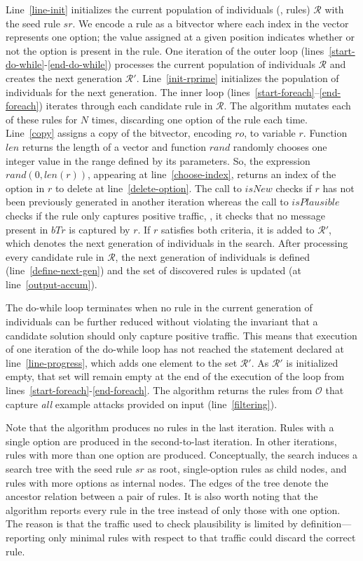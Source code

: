 \documentclass[sigconf,review, anonymous]{acmart}
\begin{document}
Line~\ref{line-init} initializes the current population of individuals
(\ie{}, rules) $\mathcal{R}$ with the seed rule $sr$. We encode a rule
as a bitvector where each index in the vector represents one option;
the value assigned at a given position indicates whether or not the
option is present in the rule. One iteration of the outer loop
(lines~\ref{start-do-while}-\ref{end-do-while}) processes the current
population of individuals $\mathcal R$ and creates the next generation
$\mathcal R'$. Line~\ref{init-rprime} initializes the population of
individuals for the next generation. The inner loop
(lines~\ref{start-foreach}--\ref{end-foreach}) iterates through each
candidate rule in $\mathcal R$. The algorithm mutates each of these
rules for $N$ times, discarding one option of the rule each
time. Line~\ref{copy} assigns a copy of the bitvector, encoding
$\mathit{ro}$, to variable $r$. Function $\mathit{len}$ returns the
length of a vector and function $\mathit{rand}$ randomly chooses one
integer value in the range defined by its parameters. So, the
expression $\mathit{rand(0, len(r))}$, appearing at
line~\ref{choose-index}, returns an index of the option in $r$ to
delete at line~\ref{delete-option}. The call to $\mathit{isNew}$
checks if $r$ has not been previously generated in another iteration
whereas the call to $\mathit{isPlausible}$ checks if the rule only
captures positive traffic, \ie{}, it checks that no message present in
$\mathit{bTr}$ is captured by $r$. If $r$ satisfies both criteria, it
is added to $\mathcal R'$, which denotes the next generation of
individuals in the search. After processing every candidate rule in
$\mathcal R$, the next generation of individuals is defined
(line~\ref{define-next-gen}) and the set of discovered rules is
updated (at line~\ref{output-accum}).

The do-while loop terminates when no rule in the current generation of
individuals can be further reduced without violating the invariant
that a candidate solution should only capture positive traffic. This
means that execution of one iteration of the do-while loop has not
reached the statement declared at line~\ref{line-progress}, which adds
one element to the set $\mathcal{R'}$. As $\mathcal{R'}$ is
initialized empty, that set will remain empty at the end of the
execution of the loop from
lines~\ref{start-foreach}-\ref{end-foreach}. The algorithm returns the
rules from $\mathcal O$ that capture \emph{all} example attacks
provided on input (line~\ref{filtering}).

Note that the algorithm produces no rules in the last iteration. Rules
with a single option are produced in the second-to-last iteration. In
other iterations, rules with more than one option are
produced. Conceptually, the search induces a search tree with the seed
rule $sr$ as root, single-option rules as child nodes, and rules with
more options as internal nodes. The edges of the tree denote the
ancestor relation between a pair of rules. It is also worth noting
that the algorithm reports every rule in the tree instead of only
those with one option. The reason is that the traffic used to check
plausibility is limited by definition---reporting only minimal rules
with respect to that traffic could discard the correct rule.
\end{document}

